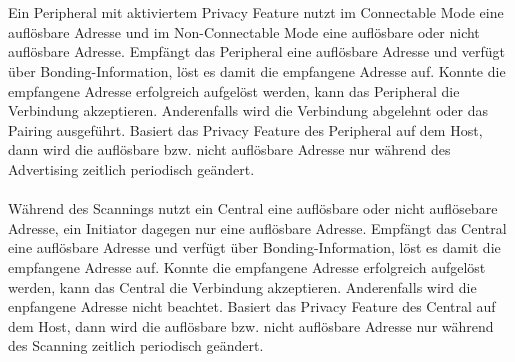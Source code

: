 \\\\
Ein Peripheral mit aktiviertem Privacy Feature nutzt im Connectable Mode eine auflösbare Adresse und im Non-Connectable Mode eine auflösbare oder nicht auflösbare Adresse. Empfängt das Peripheral eine auflösbare Adresse und verfügt über Bonding-Information, löst es damit die empfangene Adresse auf. Konnte die empfangene Adresse erfolgreich aufgelöst werden, kann das Peripheral die Verbindung akzeptieren. Anderenfalls wird die Verbindung abgelehnt oder das Pairing ausgeführt. Basiert das Privacy Feature des Peripheral auf dem Host, dann wird die auflösbare bzw. nicht auflösbare Adresse nur während des Advertising zeitlich periodisch geändert. \cite{BtSpec4.2_2077}
\\\\
Während des Scannings nutzt ein Central eine auflösbare oder nicht auflösebare Adresse, ein Initiator dagegen nur eine auflösbare Adresse. Empfängt das Central eine auflösbare Adresse und verfügt über Bonding-Information, löst es damit die empfangene Adresse auf. Konnte die empfangene Adresse erfolgreich aufgelöst werden, kann das Central die Verbindung akzeptieren. Anderenfalls wird die enpfangene Adresse nicht beachtet. Basiert das Privacy Feature des Central auf dem Host, dann wird die auflösbare bzw. nicht auflösbare Adresse nur während des Scanning zeitlich periodisch geändert. \cite{BtSpec4.2_2078}
